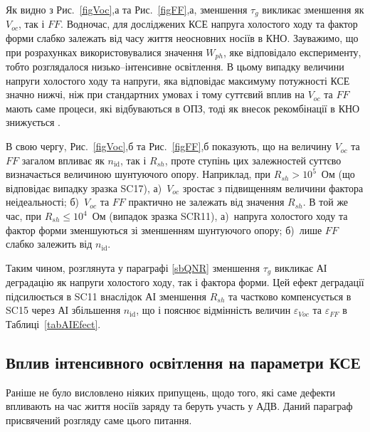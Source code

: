 Як видно з Рис.~\ref{figVoc},а та Рис.~\ref{figFF},а, зменшення $\tau_g$ викликає зменшення як $V_{oc}$, так і $F\!F$.
Водночас, для досліджених КСЕ напруга холостого ходу та фактор форми слабко залежать від
часу життя неосновних носіїв в КНО.
Зауважимо, що при розрахунках використовувалися значення $W_{ph}$, яке відповідало експерименту,
тобто розглядалося низько--інтенсивне освітлення.
В цьому випадку величини напруги холостого ходу та напруги, яка відповідає максимуму потужності КСЕ значно нижчі,
ніж при стандартних умовах і тому суттєвий вплив на $V_{oc}$ та $F\!F$ мають саме процеси, які відбуваються
в ОПЗ, тоді як внесок рекомбінації в КНО знижується \cite{Breitenstein2013}.

В свою чергу, Рис.~\ref{figVoc},б та Рис.~\ref{figFF},б показують,
що на величину $V_{oc}$ та $F\!F$ загалом впливає як $n_\mathrm{id}$, так і $R_{sh}$,
проте ступінь цих залежностей суттєво визначається величиною шунтуючого опору.
Наприклад, при $R_{sh}>10^5$~Ом (що відповідає випадку зразка SC17),
а)~$V_{oc}$ зростає з підвищенням величини фактора неідеальності;
б)~$V_{oc}$ та $FF$ практично не залежать від значення $R_{sh}$.
В той же час, при $R_{sh}\leq10^4$~Ом (випадок зразка SCR11),
а)~напруга холостого ходу та фактор форми зменшуються зі зменшенням шунтуючого опору;
б)~лише $F\!F$ слабко залежить від $n_\mathrm{id}$.

Таким чином, розглянута у параграфі \ref{sbQNR} зменшення $\tau_g$ викликає АІ деградацію як напруги
холостого ходу, так і фактора форми.
Цей ефект деградації підсилюється в SC11 внаслідок АІ зменшення $R_{sh}$ та частково компенсується в SC15
через АІ збільшення $n_\mathrm{id}$, що і пояснює відмінність величин $\varepsilon_{Voc}$ та $\varepsilon_{FF}$ в Таблиці~\ref{tabAIEfect}.




\subsection{Вплив інтенсивного освітлення на параметри КСЕ\label{sbDefectType}}
Раніше не було висловлено ніяких припущень, щодо того, які саме дефекти впливають на час життя
носіїв заряду та беруть участь у АДВ.
Даний параграф присвячений розгляду саме цього питання.

